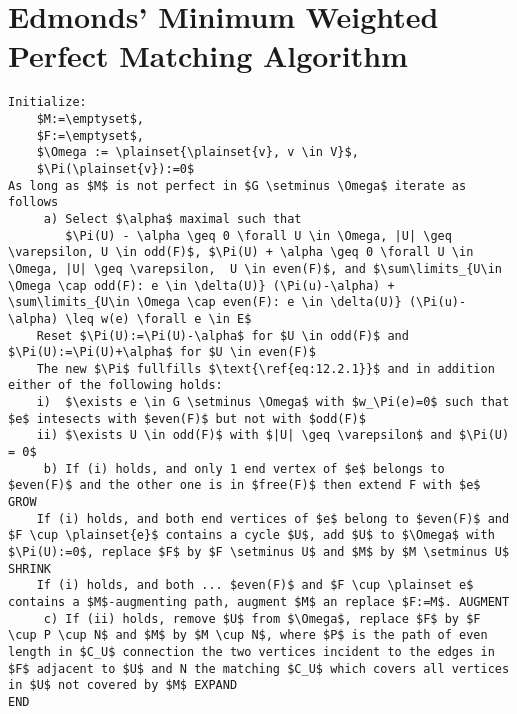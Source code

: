 \section*{Edmonds' Minimum Weighted Perfect Matching Algorithm}
\begin{lstlisting}
Initialize:
	$M:=\emptyset$, 
	$F:=\emptyset$,
	$\Omega := \plainset{\plainset{v}, v \in V}$,
	$\Pi(\plainset{v}):=0$
As long as $M$ is not perfect in $G \setminus \Omega$ iterate as follows
     a) Select $\alpha$ maximal such that 
		$\Pi(U) - \alpha \geq 0 \forall U \in \Omega, |U| \geq \varepsilon, U \in odd(F)$, $\Pi(U) + \alpha \geq 0 \forall U \in \Omega, |U| \geq \varepsilon,  U \in even(F)$, and $\sum\limits_{U\in \Omega \cap odd(F): e \in \delta(U)} (\Pi(u)-\alpha) + \sum\limits_{U\in \Omega \cap even(F): e \in \delta(U)} (\Pi(u)-\alpha) \leq w(e) \forall e \in E$
	Reset $\Pi(U):=\Pi(U)-\alpha$ for $U \in odd(F)$ and $\Pi(U):=\Pi(U)+\alpha$ for $U \in even(F)$
	The new $\Pi$ fullfills $\text{\ref{eq:12.2.1}}$ and in addition either of the following holds:
	i)  $\exists e \in G \setminus \Omega$ with $w_\Pi(e)=0$ such that $e$ intesects with $even(F)$ but not with $odd(F)$
	ii) $\exists U \in odd(F)$ with $|U| \geq \varepsilon$ and $\Pi(U) = 0$
     b) If (i) holds, and only 1 end vertex of $e$ belongs to $even(F)$ and the other one is in $free(F)$ then extend F with $e$ GROW
	If (i) holds, and both end vertices of $e$ belong to $even(F)$ and $F \cup \plainset{e}$ contains a cycle $U$, add $U$ to $\Omega$ with $\Pi(U):=0$, replace $F$ by $F \setminus U$ and $M$ by $M \setminus U$ SHRINK
	If (i) holds, and both ... $even(F)$ and $F \cup \plainset e$ contains a $M$-augmenting path, augment $M$ an replace $F:=M$. AUGMENT
     c) If (ii) holds, remove $U$ from $\Omega$, replace $F$ by $F \cup P \cup N$ and $M$ by $M \cup N$, where $P$ is the path of even length in $C_U$ connection the two vertices incident to the edges in $F$ adjacent to $U$ and N the matching $C_U$ which covers all vertices in $U$ not covered by $M$ EXPAND
END
\end{lstlisting}
